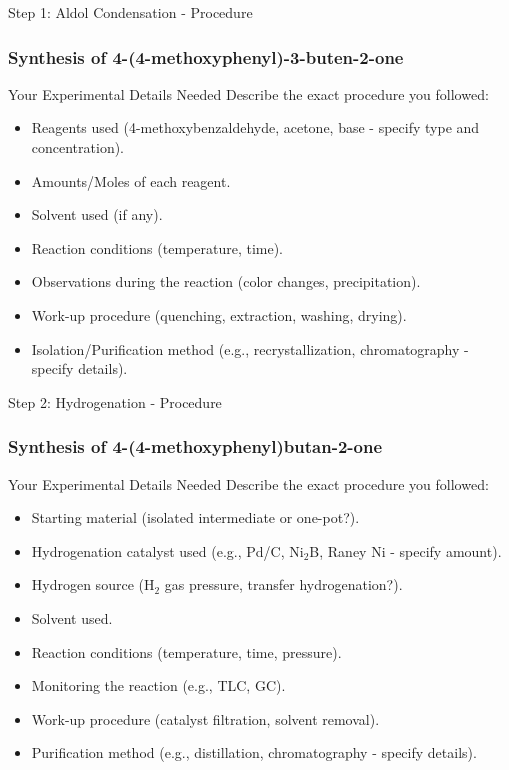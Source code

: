 \documentclass[10pt]{beamer}
\begin{document}
\begin{frame}{Step 1: Aldol Condensation - Procedure}
    \frametitle{Synthesis of 4-(4-methoxyphenyl)-3-buten-2-one}
    \begin{alertblock}{Your Experimental Details Needed}
        Describe the exact procedure you followed:
        \begin{itemize}
            \item Reagents used (4-methoxybenzaldehyde, acetone, base - specify type and concentration).
            \item Amounts/Moles of each reagent.
            \item Solvent used (if any).
            \item Reaction conditions (temperature, time).
            \item Observations during the reaction (color changes, precipitation).
            \item Work-up procedure (quenching, extraction, washing, drying).
            \item Isolation/Purification method (e.g., recrystallization, chromatography - specify details).
        \end{itemize}
    \end{alertblock}
\end{frame}

\begin{frame}{Step 2: Hydrogenation - Procedure}
    \frametitle{Synthesis of 4-(4-methoxyphenyl)butan-2-one}
     \begin{alertblock}{Your Experimental Details Needed}
        Describe the exact procedure you followed:
        \begin{itemize}
            \item Starting material (isolated intermediate or one-pot?).
            \item Hydrogenation catalyst used (e.g., Pd/C, Ni$_2$B, Raney Ni - specify amount).
            \item Hydrogen source (H$_2$ gas pressure, transfer hydrogenation?).
            \item Solvent used.
            \item Reaction conditions (temperature, time, pressure).
            \item Monitoring the reaction (e.g., TLC, GC).
            \item Work-up procedure (catalyst filtration, solvent removal).
            \item Purification method (e.g., distillation, chromatography - specify details).
        \end{itemize}
    \end{alertblock}
\end{frame}
\end{document}
